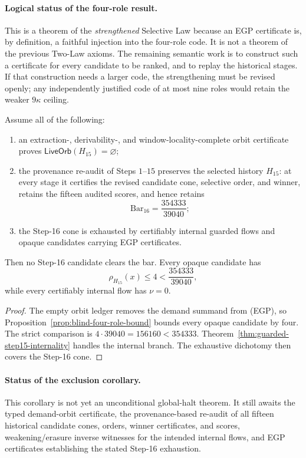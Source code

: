\paragraph{Logical status of the four-role result.}
This is a theorem of the \emph{strengthened} Selective Law because an EGP
certificate is, by definition, a faithful injection into the four-role code.
It is not a theorem of the previous Two-Law axioms. The remaining semantic work
is to construct such a certificate for every candidate to be ranked, and to
replay the historical stages. If that construction needs a larger code, the
strengthening must be revised openly; any independently justified code of at
most nine roles would retain the weaker \(9\kappa\) ceiling.

\begin{corollary}
\label{cor:conditional-step16-egp-exclusion}
Assume all of the following:
\begin{enumerate}[leftmargin=*]
\item an extraction-, derivability-, and window-locality-complete orbit
certificate proves \(\mathsf{LiveOrb}(H_{15})=\varnothing\);
\item the provenance re-audit of Steps \(1\)--\(15\) preserves the selected
history \(H_{15}\): at every stage it certifies the revised candidate cone,
selective order, and winner, retains the fifteen audited scores, and hence
retains
\[
  \mathrm{Bar}_{16}=\frac{354333}{39040};
\]
\item the Step-16 cone is exhausted by certifiably internal guarded flows and
opaque candidates carrying EGP certificates.
\end{enumerate}
Then no Step-16 candidate clears the bar. Every opaque candidate has
\[
  \rho_{H_{15}}(x)\le4
  <
  \frac{354333}{39040},
\]
while every certifiably internal flow has \(\nu=0\).
\end{corollary}

\begin{proof}
The empty orbit ledger removes the demand summand from (EGP), so
Proposition~\ref{prop:blind-four-role-bound} bounds every opaque candidate by
four. The strict comparison is \(4\cdot39040=156160<354333\).
Theorem~\ref{thm:guarded-step15-internality} handles the internal branch. The
exhaustive dichotomy then covers the Step-16 cone.
\end{proof}

\paragraph{Status of the exclusion corollary.}
This corollary is not yet an unconditional global-halt theorem. It still awaits
the typed demand-orbit certificate, the provenance-based re-audit of all
fifteen historical candidate cones, orders, winner certificates, and scores,
weakening/erasure inverse witnesses for the intended internal flows, and EGP
certificates establishing the stated Step-16 exhaustion.

